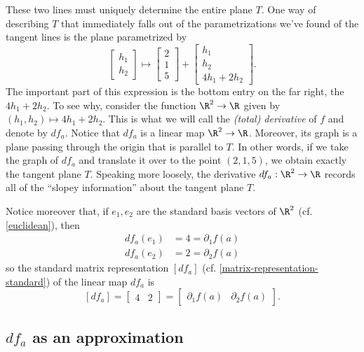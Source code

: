 These two lines must uniquely determine the entire plane $T$. One way of describing $T$ that immediately falls out of the parametrizations we've found of the tangent lines is the plane parametrized by
\[ \begin{bmatrix} h_1 \\ h_2 \end{bmatrix} \mapsto \begin{bmatrix} 2 \\ 1 \\ 5 \end{bmatrix} + \begin{bmatrix} h_1 \\ h_2 \\ 4h_1 + 2h_2 \end{bmatrix}. \]
The important part of this expression is the bottom entry on the far right, the $4h_1 + 2h_2$. To see why, consider the function $\R^2 \to \R$ given by $(h_1, h_2)  \mapsto 4h_1 + 2h_2$. This is what we will call the \emph{(total) derivative} of $f$ and denote by $df_a$. Notice that $df_a$ is a linear map $\R^2 \to \R$. Moreover, its graph is a plane passing through the origin that is parallel to $T$. In other words, if we take the graph of $df_a$ and translate it over to the point $(2,1,5)$, we obtain exactly the tangent plane $T$. Speaking more loosely, the derivative $df_a : \R^2 \to \R$ records all of the ``slopey information'' about the tangent plane $T$. 

Notice moreover that, if $e_1, e_2$ are the standard basis vectors of $\R^2$ (cf. \cref{euclidean}), then
\[ \begin{aligned} df_a(e_1) &= 4 = \partial_1  f(a) \\
df_a(e_2) &= 2 = \partial_2 f(a) \end{aligned} \]
so the standard matrix representation $[df_a]$ (cf. \cref{matrix-representation-standard}) of the linear map $df_a$ is \begin{equation} \label{jacobian-matrix-example} [df_a] = \begin{bmatrix} 4 & 2 \end{bmatrix} = \begin{bmatrix} \partial_1 f(a) & \partial_2 f(a) \end{bmatrix}. \end{equation}

\subsection*{\texorpdfstring{$df_a$}{dfa} as an approximation}

